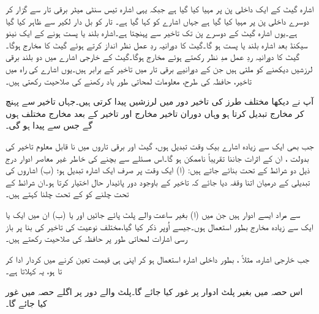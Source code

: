  اشارہ   گیٹ کے ایک داخلی پن پر مہیا کیا گیا ہے جبکہ یہی  اشارہ تیس سنٹی میٹر  برقی تار سے  گزار کر دوسرے داخلی پن پر مہیا کیا گیا ہے جہاں اشارے کو  کہا گیا ہے۔ تار کو بل دار لکیر سے ظاہر کیا گیا ہے۔یوں اشارہ  گیٹ کے  دوسرے پن تک تاخیر سے پہنچتا ہے۔اشارہ   بلند یا پست ہونے کے ایک نینو سیکنڈ بعد اشارہ   بلند یا پست ہو گا۔گیٹ کا دورانیہ ردِ عمل نظر انداز کرتے ہوئے گیٹ کا  مخارج   ہوگا۔ گیٹ کا دورانیہ ردِ عمل مدِ نظر رکھتے ہوئے مخارج   ہوگا۔گیٹ کے خارجی اشارے میں دو بلند برقی لرزشیں  دیکھنے کو ملتی ہیں جن کے دورانیے برقی تار میں تاخیر کے برابر ہیں۔یوں اشارے  کی راہ میں  تاخیر،   حافظہ کی طرح، معلومات   لمحاتی طور یاد  رکھنے کی صلاحیت رکھتی ہیں۔

آپ نے دیکھا مختلف طرز کی  تاخیر  دور میں لرزشیں پیدا  کرتی ہیں۔جہاں تاخیر سے پہنچ کر مخارج تبدیل کرتا ہو وہاں دوران تاخیر مخارج اور تاخیر کے بعد مخارج مختلف ہوں گے  جس سے   پیدا ہو گی۔

 جب بھی ایک سے زیادہ اشارے بیک وقت تبدیل ہوں، گیٹ اور برقی تاروں میں نا قابل  معلوم  تاخیر کی بدولت   ، ان کے اثرات جاننا   تقریباً ناممکن ہو گا۔اس مسئلے سے بچنے کی خاطر  غیر معاصر ادوار  درج ذیل دو شرائط کے تحت  بنائے جاتے ہیں: (ا)  ایک وقت پر صرف ایک  اشارہ تبدیل ہو؛ (ب)  اشاروں  کی تبدیلی کے درمیان اتنا وقفہ دیا  جائے کہ  تاخیر کے باوجود دور  پائیدار حال اختیار کرتا ہو۔ان شرائط کے تحت  چلنے کو   کے تحت چلنا کہتے ہیں۔

 سے مراد ایسے  ادوار ہیں جن میں  (ا) بغیر ساعت   والے پلٹ پائے جائیں اور یا   (ب) ان میں ایک یا ایک سے زیادہ مخارج بطور  استعمال ہوں۔جیسے اُوپر ذکر کیا گیا،مختلف نوعیت کی  تاخیر کی بنا پر  باز رسی اشارات لمحاتی طور پر    حافظہ کی صلاحیت رکھتے ہیں۔

جب   خارجی اشارہ، مثلاً ،   بطور داخلی اشارہ  استعمال  ہو کر  اپنی  ہی قیمت  تعین کرنے میں کردار ادا کر تا ہو،  یہ   کہلاتا ہے۔

اس حصہ میں بغیر پلٹ  ادوار پر غور کیا جائے گا۔پلٹ والے دور پر اگلے حصہ میں غور کیا جائے گا۔

